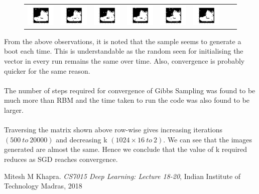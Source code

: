 \documentclass[12pt]{report}
\begin{document}
\begin{figure}[H]
\begin{tabular}{cccccccc}
  \includegraphics[width=0.15\linewidth]{31.png} &   \includegraphics[width=0.15\linewidth]{32.png} &
  \includegraphics[width=0.15\linewidth]{33.png} &   \includegraphics[width=0.15\linewidth]{34.png} &
  \includegraphics[width=0.15\linewidth]{35.png} &   \includegraphics[width=0.15\linewidth]{36.png}  \\
\end{tabular}
\end{figure}
From the above observations, it is noted that the sample seems to generate a boot each time. This is understandable as the random seen for initialising the vector in every run remains the same over time. Also, convergence is probably quicker for the same reason.\\\\
The number of steps required for convergence of Gibbs Sampling was found to be much more than RBM and the time taken to run the code was also found to be larger.\\\\
Traversing the matrix shown above row-wise gives increasing iterations $(500 \ to \ 20000)$ and decreasing k $(1024 \times 16 \ to \ 2)$. We can see that the images generated are almost the same. Hence we conclude that the value of k required reduces as SGD reaches convergence.
\begin{thebibliography}{9}
Mitesh M Khapra. \textit{CS7015 Deep Learning: Lecture 18-20}, 
Indian Institute of Technology Madras, 2018
\end{thebibliography}
\end{document}
